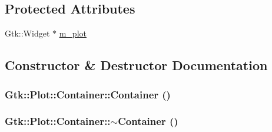 \subsection*{Protected Attributes}
\begin{DoxyCompactItemize}
\item 
Gtk::Widget $\ast$ \hyperlink{classGtk_1_1Plot_1_1Container_a152cefd80bbba01059ef963dbeb4ccda}{m\_\-plot}
\end{DoxyCompactItemize}


\subsection{Constructor \& Destructor Documentation}
\hypertarget{classGtk_1_1Plot_1_1Container_af956e659361643a2b642c2005e2da389}{
\subsubsection[{Container}]{\setlength{\rightskip}{0pt plus 5cm}Gtk::Plot::Container::Container ()}}
\label{classGtk_1_1Plot_1_1Container_af956e659361643a2b642c2005e2da389}
\hypertarget{classGtk_1_1Plot_1_1Container_ab1e67689eeaee019a1413a9daf6a9208}{
\subsubsection[{$\sim$Container}]{\setlength{\rightskip}{0pt plus 5cm}Gtk::Plot::Container::$\sim$Container ()}}
\label{classGtk_1_1Plot_1_1Container_ab1e67689eeaee019a1413a9daf6a9208}


